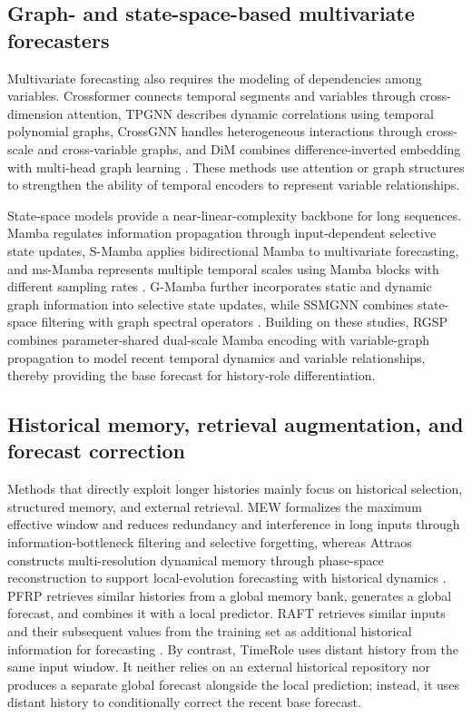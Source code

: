 \subsection{Graph- and state-space-based multivariate forecasters}

Multivariate forecasting also requires the modeling of dependencies among variables. Crossformer connects temporal segments and variables through cross-dimension attention, TPGNN describes dynamic correlations using temporal polynomial graphs, CrossGNN handles heterogeneous interactions through cross-scale and cross-variable graphs, and DiM combines difference-inverted embedding with multi-head graph learning \citep{Zhang2023Crossformer,Liu2022TPGNN,Huang2023CrossGNN,Mo2026DiM}. These methods use attention or graph structures to strengthen the ability of temporal encoders to represent variable relationships.

State-space models provide a near-linear-complexity backbone for long sequences. Mamba regulates information propagation through input-dependent selective state updates, S-Mamba applies bidirectional Mamba to multivariate forecasting, and ms-Mamba represents multiple temporal scales using Mamba blocks with different sampling rates \citep{Gu2024Mamba,Wang2025SMamba,Karadag2026msMamba}. G-Mamba further incorporates static and dynamic graph information into selective state updates, while SSMGNN combines state-space filtering with graph spectral operators \citep{Chen2026GMamba,Zhou2026SSMGNN}. Building on these studies, RGSP combines parameter-shared dual-scale Mamba encoding with variable-graph propagation to model recent temporal dynamics and variable relationships, thereby providing the base forecast for history-role differentiation.

\subsection{Historical memory, retrieval augmentation, and forecast correction}

Methods that directly exploit longer histories mainly focus on historical selection, structured memory, and external retrieval. MEW formalizes the maximum effective window and reduces redundancy and interference in long inputs through information-bottleneck filtering and selective forgetting, whereas Attraos constructs multi-resolution dynamical memory through phase-space reconstruction to support local-evolution forecasting with historical dynamics \citep{Zhang2025MEW,Hu2024Attraos}. PFRP retrieves similar histories from a global memory bank, generates a global forecast, and combines it with a local predictor. RAFT retrieves similar inputs and their subsequent values from the training set as additional historical information for forecasting \citep{Du2026PFRP,Han2025RAFT}. By contrast, TimeRole uses distant history from the same input window. It neither relies on an external historical repository nor produces a separate global forecast alongside the local prediction; instead, it uses distant history to conditionally correct the recent base forecast.

